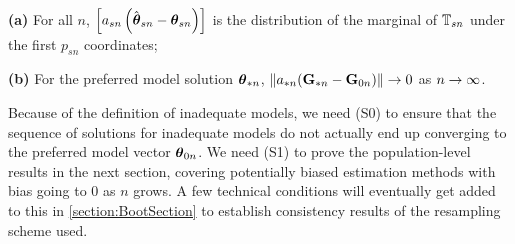\noindent\textbf{(a)} For all $n$, $\left[ a_{s n} \left( \hat {{\boldsymbol{\theta}}}_{s n} - {\boldsymbol{\theta}}_{s n} \right)  \right]
$ is the distribution of the marginal of ${\mathbb{T}}_{s n}$ under the first $p_{s n}$ coordinates;

\noindent\textbf{(b)} For the preferred model solution ${\boldsymbol{\theta}}_{* n}$, $\| a_{* n} ({\mathbf{G}}_{* n} - {\mathbf{G}}_{0 n}) \| \rightarrow 0$ as $n \rightarrow \infty$.
\vspace{1em}


Because of the definition of inadequate models, we need (S0) to ensure that the sequence of solutions for inadequate models do not actually end up converging to the preferred model vector ${\boldsymbol{\theta}}_{0 n}$. We need (S1) to prove the population-level results in the next section, covering potentially biased estimation methods with bias going to 0 as $n$ grows. A few technical conditions will eventually get added to this in \ref{section:BootSection} to establish consistency results of the resampling scheme used.